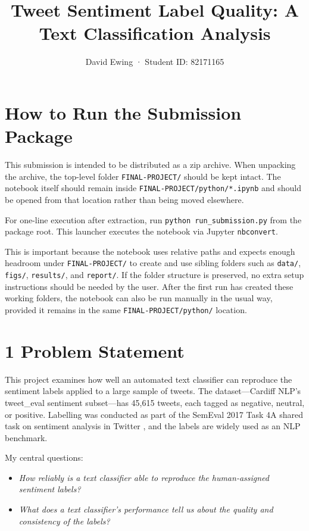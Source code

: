 \documentclass[12pt]{article}
\title{Tweet Sentiment Label Quality: A Text Classification Analysis}
\author{David Ewing · Student ID: 82171165}
\date{}
\begin{document}
\maketitle

\section*{How to Run the Submission Package}

This submission is intended to be distributed as a zip archive.
When unpacking the archive, the top-level folder \texttt{FINAL-PROJECT/} should be kept intact.
The notebook itself should remain inside \texttt{FINAL-PROJECT/python/*.ipynb} and should be opened from that location rather than being moved elsewhere.

For one-line execution after extraction, run \texttt{python run\_submission.py} from the package root.
This launcher executes the notebook via Jupyter \texttt{nbconvert}.

This is important because the notebook uses relative paths and expects enough headroom under \texttt{FINAL-PROJECT/} to create and use sibling folders such as \texttt{data/}, \texttt{figs/}, \texttt{results/}, and \texttt{report/}.
If the folder structure is preserved, no extra setup instructions should be needed by the user.
After the first run has created these working folders, the notebook can also be run manually in the usual way, provided it remains in the same \texttt{FINAL-PROJECT/python/} location.



\section*{1 Problem Statement}



This project examines how well an automated text classifier can reproduce the sentiment labels applied to a large sample of tweets. The dataset---Cardiff NLP's tweet\_eval sentiment subset---has 45,615 tweets, each tagged as negative, neutral, or positive. Labelling was conducted as part of the SemEval 2017 Task 4A shared task on sentiment analysis in Twitter \citep{rosenthal2017semeval}, and the labels are widely used as an NLP benchmark.

My central questions: 

\begin{itemize}
  \item \textit{How reliably is a text classifier able to reproduce the human-assigned sentiment labels?}
  \item \textit{What does a text classifier's performance tell us about the quality and consistency of the labels?}
\end{itemize}
\end{document}
